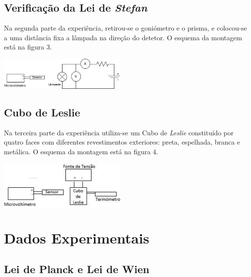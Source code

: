 \documentclass[9pt]{extarticle}
\begin{document}
\begin{multicols}{2}
\subsection{Verificação da Lei de \textit{Stefan}}
\par Na segunda parte da experiência, retirou-se o goniómetro e o prisma, e colocou-se a uma distância fixa a lâmpada na direção do detetor. O esquema da montagem está na figura 3.

\vspace{-1cm}

\begin{center}
\includegraphics[width=180pt]{parte2.jpg}
\begin{center}
\par{}
\end{center}
\end{center}

\subsection{Cubo de Leslie}
Na terceira parte da experiência utiliza-se um Cubo de \textit{Leslie} constituído por quatro faces com diferentes revestimentos exteriores: preta, espelhada, branca e metálica. O esquema da montagem está na figura 4.

\begin{center}
\includegraphics[width=180pt]{parte3.jpg}
\begin{center}
\par{}
\end{center}
\end{center}


\section{Dados Experimentais}

\subsection{Lei de Planck e Lei de Wien}


\end{multicols}
\end{document}
